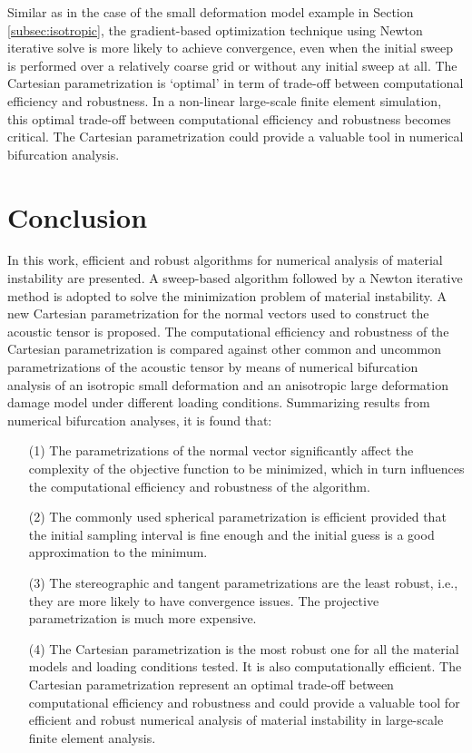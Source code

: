 \documentclass[12pt]{article}
\numberwithin{equation}{section}
\begin{document}
Similar as in the case of the small deformation model example in
Section \ref{subsec:isotropic}, the gradient-based optimization
technique using Newton iterative solve is more likely to achieve
convergence, even when the initial sweep is performed over a
relatively coarse grid or without any initial sweep at all. The
Cartesian parametrization is `optimal' in term of trade-off between
computational efficiency and robustness. In a non-linear large-scale
finite element simulation, this optimal trade-off between
computational efficiency and robustness becomes critical. The
Cartesian parametrization could provide a valuable tool in numerical
bifurcation analysis.

\section{Conclusion}

In this work, efficient and robust algorithms for numerical analysis
of material instability are presented. A sweep-based algorithm
followed by a Newton iterative method is adopted to solve the
minimization problem of material instability. A new Cartesian
parametrization for the normal vectors used to construct the acoustic
tensor is proposed. The computational efficiency and robustness of the
Cartesian parametrization is compared against other common and
uncommon parametrizations of the acoustic tensor by means of numerical
bifurcation analysis of an isotropic small deformation and an
anisotropic large deformation damage model under different loading
conditions. Summarizing results from numerical bifurcation analyses,
it is found that:

\begin{enumerate}
\item[(1)]
The parametrizations of the normal vector significantly affect the
complexity of the objective function to be minimized, which in turn
influences the computational efficiency and robustness of the
algorithm.

\item[(2)]
The commonly used spherical parametrization is efficient provided
that the initial sampling interval is fine enough and the initial
guess is a good approximation to the minimum.

\item[(3)]
The stereographic and tangent parametrizations are the least
robust, i.e., they are more likely to have convergence issues. The
projective parametrization is much more expensive.

\item[(4)]
The Cartesian parametrization is the most robust one for all the
material models and loading conditions tested. It is also
computationally efficient. The Cartesian parametrization represent an
optimal trade-off between computational efficiency and robustness and
could provide a valuable tool for efficient and robust numerical
analysis of material instability in large-scale finite element
analysis.
\end{enumerate}

%


\end{document}
